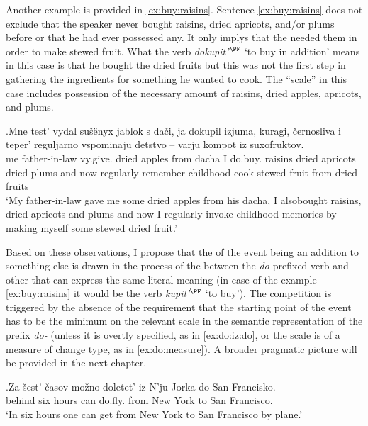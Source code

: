 Another example is provided in \ref{ex:buy:raisins}. Sentence \ref{ex:buy:raisins} does not exclude that the speaker never bought raisins, dried apricots, and/or plums before or that he had ever possessed any. It only implys that the needed them in order to make stewed fruit. What the verb \textit{dokupit'}$^{\PF}$ `to buy in addition' means in this case is that he bought the dried fruits but this was not the first step in gathering the ingredients for something he wanted to cook. The ``scale'' in this case includes possession of the necessary amount of raisins, dried apples, apricots, and plums. 

\exg.\label{ex:buy:raisins}Mne test' vydal su\v{s}\"{e}nyx jablok s da\v{c}i, ja dokupil izjuma, kuragi, \v{c}ernosliva i teper' reguljarno vspominaju detstvo -- varju kompot iz suxofruktov.\\
me father-in-law vy.give. dried apples from dacha I do.buy. raisins {dried apricots} {dried plums} and now regularly remember childhood {} cook {stewed fruit} from {dried fruits}\\
\trans `My father-in-law gave me some dried apples from his dacha, I also\linebreak bought raisins, dried apricots and plums and now I regularly invoke childhood memories by making myself some stewed dried fruit.'\\

Based on these observations, I propose that the  of the event being an addition to something else is drawn in the process of the  between the \textit{do-}prefixed verb and other  that can express the same literal meaning (in case of the example \ref{ex:buy:raisins} it would be the verb \textit{kupit'$^{\PF}$} `to buy'). The competition is triggered by the absence of the requirement that the starting point of the event has to be the minimum on the relevant scale in the semantic representation of the prefix \textit{do-} (unless it is overtly specified, as in \ref{ex:do:iz:do}, or the scale is of a measure of change type, as in \ref{ex:do:measure}). A broader pragmatic picture will be provided in the next chapter.

\exg.\label{ex:do:iz:do}Za \v{s}est' \v{c}asov mo\v{z}no doletet' iz N'ju-Jorka do San-Francisko.\\
behind six hours can do.fly. from {New York} to {San Francisco}.\\
\trans `In six hours one can get from New York to San Francisco by plane.'\\

